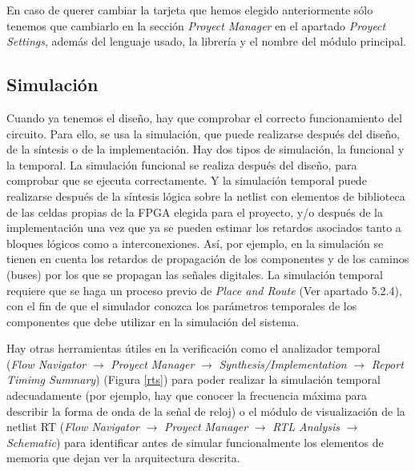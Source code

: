 En caso de querer cambiar la tarjeta que hemos elegido anteriormente sólo tenemos que cambiarlo en la sección \textit{Proyect Manager} en el 
apartado \textit{Proyect Settings}, además del lenguaje usado, la librería y el nombre del módulo principal.

\subsection{Simulación}

Cuando ya tenemos el diseño, hay que comprobar el correcto funcionamiento del circuito. Para ello, se usa la simulación, que puede realizarse después del 
diseño, de la síntesis o de la implementación. Hay dos tipos de simulación, la funcional y la temporal. La simulación funcional se realiza después del 
diseño, para comprobar que se ejecuta correctamente. Y la simulación temporal puede realizarse después de la síntesis lógica sobre la netlist con 
elementos de biblioteca de las celdas propias de la FPGA elegida para el proyecto, y/o después de la implementación una vez que ya se pueden estimar 
los retardos asociados tanto a bloques lógicos como a interconexiones. Así, por ejemplo, en la simulación se tienen en cuenta los retardos de propagación 
de los componentes y de los caminos (buses) por los que se propagan las señales digitales. La simulación temporal requiere que se haga un proceso previo de 
\textit{Place and Route} (Ver apartado 5.2.4), con el fin de que el simulador conozca los parámetros temporales de los componentes que debe utilizar en la 
simulación del sistema.

Hay otras herramientas útiles en la verificación como el analizador temporal (\textit{Flow Navigator} $\rightarrow$ \textit{Proyect Manager} 
$\rightarrow$ \textit{Synthesis/Implementation} $\rightarrow$ \textit{Report Timimg Summary}) (Figura \ref{rts}) para poder realizar la simulación temporal adecuadamente (por ejemplo, hay 
que conocer la frecuencia máxima para describir la forma de onda de la señal de reloj) o el módulo de visualización de la netlist RT (\textit{Flow Navigator} 
$\rightarrow$ \textit{Proyect Manager} $\rightarrow$ \textit{RTL Analysis} $\rightarrow$ \textit{Schematic}) para identificar 
antes de simular funcionalmente los elementos de memoria que dejan ver la arquitectura descrita.  

